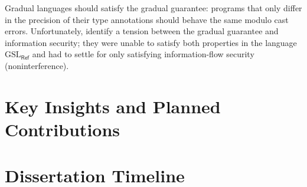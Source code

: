 \documentclass[10pt, letterpaper]{article}
\newcommand{\GSLRef}{\ensuremath{\mathrm{GSL}_\mathsf{Ref}}\xspace}
\begin{document}
Gradual languages should satisfy the gradual guarantee: programs that only
differ in the precision of their type annotations should behave the same modulo
cast errors. Unfortunately, \citet{Toro:2018aa} identify a tension between the
gradual guarantee and information security; they were unable to satisfy both
properties in the language \GSLRef and had to settle for only satisfying
information-flow security (noninterference).

\section{Key Insights and Planned Contributions}

\section{Dissertation Timeline}

\clearpage


\end{document}
